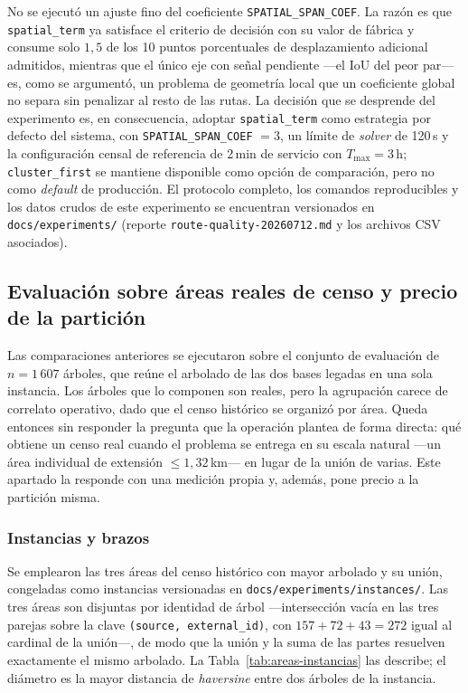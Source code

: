 No se ejecutó un ajuste fino del coeficiente \texttt{SPATIAL\_SPAN\_COEF}. La
razón es que \texttt{spatial\_term} ya satisface el criterio de decisión con su
valor de fábrica y consume solo $1{,}5$ de los 10 puntos porcentuales de
desplazamiento adicional admitidos, mientras que el único eje con señal
pendiente ---el IoU del peor par--- es, como se argumentó, un problema de
geometría local que un
coeficiente global no separa sin penalizar al resto de las rutas. La decisión
que se desprende del experimento es, en consecuencia, adoptar
\texttt{spatial\_term} como estrategia por defecto del sistema, con
\texttt{SPATIAL\_SPAN\_COEF} $=3$, un límite de \textit{solver} de 120\,s y la
configuración censal de referencia de 2\,min de servicio con $T_{\max}=3$\,h;
\texttt{cluster\_first} se mantiene disponible como opción de comparación, pero
no como \textit{default} de producción. El protocolo completo, los comandos
reproducibles y los datos crudos de este experimento se encuentran versionados en
\texttt{docs/experiments/} (reporte \texttt{route-quality-20260712.md} y los
archivos CSV asociados).

\subsection{Evaluación sobre áreas reales de censo y precio de la partición}
\label{sec:areas-reales}

Las comparaciones anteriores se ejecutaron sobre el conjunto de evaluación de
$n = 1\,607$ árboles, que reúne el arbolado de las dos bases legadas en una sola
instancia. Los árboles que lo componen son reales, pero la agrupación carece de
correlato operativo, dado que el censo histórico se organizó por área. Queda
entonces sin responder la pregunta que la operación plantea de forma directa:
qué obtiene un censo real cuando el problema se entrega en su escala natural
---un área individual de extensión $\leq 1{,}32$\,km--- en lugar de la unión de
varias. Este apartado la responde con una medición propia y, además, pone precio
a la partición misma.

\subsubsection*{Instancias y brazos}

Se emplearon las tres áreas del censo histórico con mayor arbolado y su unión,
congeladas como instancias versionadas en
\texttt{docs/experiments/instances/}. Las tres áreas son disjuntas por identidad
de árbol ---intersección vacía en las tres parejas sobre la clave
\texttt{(source, external\_id)}, con $157 + 72 + 43 = 272$ igual al cardinal de
la unión---, de modo que la unión y la suma de las partes resuelven exactamente
el mismo arbolado. La Tabla~\ref{tab:areas-instancias} las describe; el diámetro
es la mayor distancia de \textit{haversine} entre dos árboles de la instancia.

